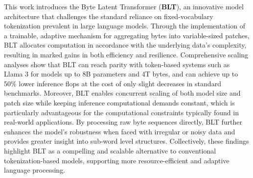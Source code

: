 This work introduces the Byte Latent Transformer (\textbf{BLT}), an innovative model architecture that challenges the standard reliance on fixed-vocabulary tokenization prevalent in large language models. Through the implementation of a trainable, adaptive mechanism for aggregating bytes into variable-sized patches, {\textsc BLT} allocates computation in accordance with the underlying data’s complexity, resulting in marked gains in both efficiency and resilience. Comprehensive scaling analyses show that {\textsc BLT} can reach parity with token-based systems such as Llama 3 for models up to 8B parameters and 4T bytes, and can achieve up to 50\% lower inference flops at the cost of only slight decreases in standard benchmarks. Moreover, {\textsc BLT} enables concurrent scaling of both model size and patch size while keeping inference computational demands constant, which is particularly advantageous for the computational constraints typically found in real-world applications. By processing raw byte sequences directly, {\textsc BLT} further enhances the model’s robustness when faced with irregular or noisy data and provides greater insight into sub-word level structures. Collectively, these findings highlight {\textsc BLT} as a compelling and scalable alternative to conventional tokenization-based models, supporting more resource-efficient and adaptive language processing.


